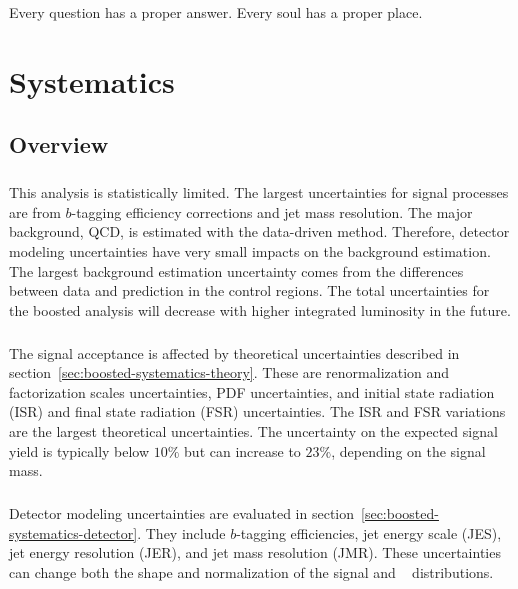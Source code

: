 \begin{savequote}[75mm]
Every question has a proper answer. Every soul has a proper place.
\end{savequote}

\chapter{Systematics}
\label{sec:systematics}


\section{Overview}
\label{sec:systematics-overview}
\paragraph{}
This analysis is statistically limited.
The largest uncertainties for signal processes are from $b$-tagging efficiency corrections and jet mass resolution.
The major background, QCD, is estimated with the data-driven method. 
Therefore, detector modeling uncertainties have very small impacts on the background estimation.
The largest background estimation uncertainty comes from the differences between data and prediction in the control regions.
The total uncertainties for the boosted analysis will decrease with higher integrated luminosity in the future.

\paragraph{}
The signal acceptance is affected by theoretical uncertainties described in section~\ref{sec:boosted-systematics-theory}.
These are renormalization and factorization scales uncertainties, PDF uncertainties, and initial state radiation (ISR) and final state radiation (FSR) uncertainties.
The ISR and FSR variations are the largest theoretical uncertainties.
The uncertainty on the expected signal yield is typically below $10\%$ but can increase to $23\%$, depending on the signal mass.

\paragraph{}
Detector modeling uncertainties are evaluated in section~\ref{sec:boosted-systematics-detector}.
They include $b$-tagging efficiencies, jet energy scale (JES), jet energy resolution (JER), and jet mass resolution (JMR).
These uncertainties can change both the shape and normalization of the signal and \ttbar~ distributions.

